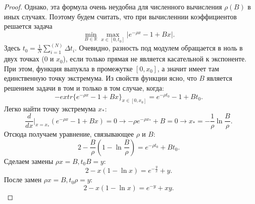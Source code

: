 \begin{appendices}
\begin{proof}
        Однако, эта формула очень неудобна для численного вычисления $\rho(B)$ в иных случаях. Поэтому будем считать,
        что при вычисленнии коэффициентов решается задача
        \begin{equation*}
                \min _{B \in \mathbb{R}} \max _{x \in [0, t_0]} |e^{- \rho x} - 1 + B x|.
        \end{equation*} 
        Здесь $t_0 = \frac{1}{N} \sum_{i=1}^(N) \Delta t_i$.
        Очевидно, разность под модулем обращается в ноль в двух точках ($0$ и $x_0$), если только прямая не является касательной к экспоненте.
        При этом, функция выпукла в промежутке $[0, x_0]$, а значит имеет там единственную точку экстремума. Из свойств функции ясно, что $B$ 
        является решением задачи в том и только в том случае, когда:
        \begin{equation*}
                - extr \{e^{-\rho x} - 1 + B x \}_{x \in [0, x_0]} = e^{-\rho t_0} - 1 + B t_0.
        \end{equation*} 
        Легко найти точку экстремума $x_*$:
        \begin{equation*}
                \frac{d}{dx} \Big| _{x=x_*} (e^{-\rho x} - 1 + B x) = 0 \rightarrow -\rho e^{-\rho x_*} + B = 0 \rightarrow x_* = -\frac{1}{\rho} \ln \frac{B}{\rho}.
        \end{equation*} 
        Отсюда получаем уравнение, связывающее $\rho$ и $B$:
        \begin{equation*}
                2 - \frac{B}{\rho}\left(1 - \ln \frac{B}{\rho}\right) = e^{- \rho t_0} + B t_0.
        \end{equation*} 
        Сделаем замены $\rho x = B, t_0 B = y$:
        \begin{equation*}
                2 - x \left(1 - \ln x\right) = e^{- \frac{y}{x}} + y.
        \end{equation*} 
        После замен $\rho x = B, t_0 \rho = y$:
        \begin{equation*}
                2 - x \left(1 - \ln x\right) = e^{- y} + x y.
        \end{equation*} 



\end{proof}
	
\end{appendices}   %